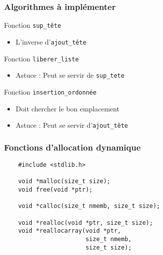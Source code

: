 \documentclass[table,handout,tikz,12pt,svgnames]{beamer}
\begin{document}

\begin{frame}[fragile=singleslide]
	\frametitle{Algorithmes à implémenter}
		\begin{block}{Fonction \texttt{sup\_tête}}
			\begin{itemize}
				\item L'inverse d'\texttt{ajout\_tête}
			\end{itemize}
		\end{block}
		\begin{block}{Fonction \texttt{liberer\_liste}}
			\begin{itemize}
				\item Astuce : Peut se servir de \texttt{sup\_tete}
			\end{itemize}
		\end{block}
		\begin{block}{Fonction \texttt{insertion\_ordonnée}}
			\begin{itemize}
				\item Doit chercher le bon emplacement			
				\item Astuce : Peut se servir d'\texttt{ajout\_tête}
			\end{itemize}
		\end{block}
\end{frame}

\begin{frame}[fragile=singleslide]
	\frametitle{Fonctions d'allocation dynamique}
\begin{verbatim}
	#include <stdlib.h>

	void *malloc(size_t size);
	void free(void *ptr);
	
	void *calloc(size_t nmemb, size_t size);
	
	void *realloc(void *ptr, size_t size);
	void *reallocarray(void *ptr,
	                   size_t nmemb,
	                   size_t size);
\end{verbatim}
\end{frame}


%


\end{document}
